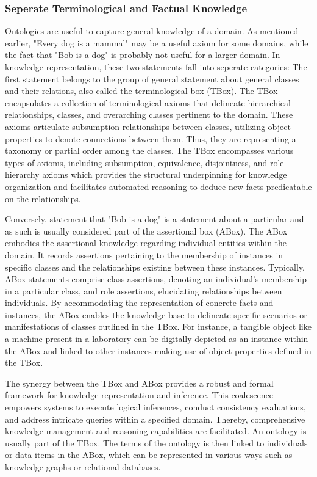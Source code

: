
\subsubsection{Seperate Terminological and Factual Knowledge}

Ontologies are useful to capture general knowledge of a domain. As mentioned earlier, "Every dog is a mammal" may be a useful axiom for some domains, while the fact that "Bob is a dog" is probably not useful for a larger domain. In knowledge representation, these two statements fall into seperate categories:
The first statement belongs to the group of general statement about general classes and their relations, also called the terminological box (TBox). The TBox encapsulates a collection of terminological axioms that delineate hierarchical relationships, classes, and overarching classes pertinent to the domain. These axioms articulate subsumption relationships between classes, utilizing object properties to denote connections between them. Thus, they are representing a taxonomy or partial order among the classes. The TBox encompasses various types of axioms, including subsumption, equivalence, disjointness, and role hierarchy axioms which provides the structural underpinning for knowledge organization and facilitates automated reasoning to deduce new facts predicatable on the relationships.

Conversely, statement that "Bob is a dog" is a statement about a particular and as such is usually considered part of the assertional box (ABox). The ABox embodies the assertional knowledge regarding individual entities within the domain. It records assertions pertaining to the membership of instances in specific classes and the relationships existing between these instances. Typically, ABox statements comprise class assertions, denoting an individual's membership in a particular class, and role assertions, elucidating relationships between individuals. By accommodating the representation of concrete facts and instances, the ABox enables the knowledge base to delineate specific scenarios or manifestations of classes outlined in the TBox. For instance, a tangible object like a machine present in a laboratory can be digitally depicted as an instance within the ABox and linked to other instances making use of object properties defined in the TBox.

The synergy between the TBox and ABox provides a robust and formal framework for knowledge representation and inference. This coalescence empowers systems to execute logical inferences, conduct consistency evaluations, and address intricate queries within a specified domain. Thereby, comprehensive knowledge management and reasoning capabilities are facilitated. An ontology is usually part of the TBox. The terms of the ontology is then linked to individuals or data items in the ABox, which can be represented in various ways such as knowledge graphs or relational databases.


